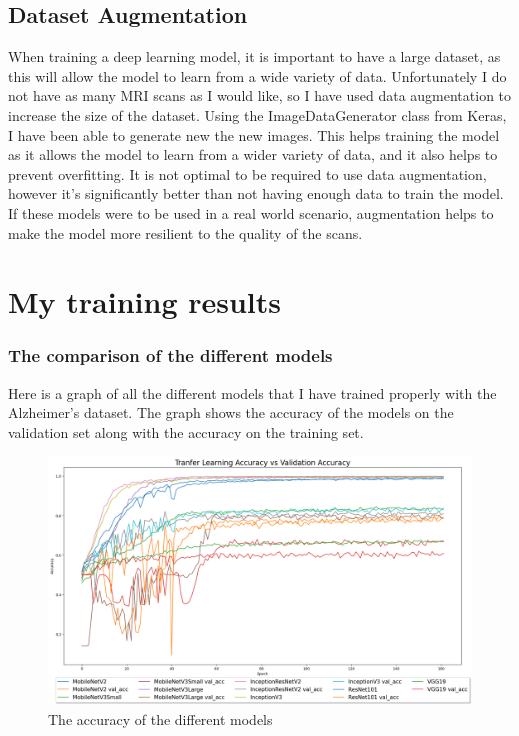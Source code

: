\documentclass[]{final_report}
\begin{document}
\section{Dataset Augmentation}

When training a deep learning model, it is important to have a large dataset, as this will allow the model to learn from a wide variety of data.
Unfortunately I do not have as many MRI scans as I would like, so I have used data augmentation to increase the size of the dataset.
Using the ImageDataGenerator class from Keras\cite{Keras}, I have been able to generate new the new images.
This helps training the model as it allows the model to learn from a wider variety of data, and it also helps to prevent overfitting.
It is not optimal to be required to use data augmentation, however it's significantly better than not having enough data to train the model.
If these models were to be used in a real world scenario, augmentation helps to make the model more resilient to the quality of the scans.

\chapter{My training results}
\subsection{The comparison of the different models}
Here is a graph of all the different models that I have trained properly with the Alzheimer's dataset.
The graph shows the accuracy of the models on the validation set along with the accuracy on the training set.
\begin{figure}[h]
  \centering
  \includegraphics[width=1\textwidth]{images/good-training-acc-vs-val.png}
  \caption{The accuracy of the different models}
  \label{fig:loss}
\end{figure}
\pagebreak
\end{document}
